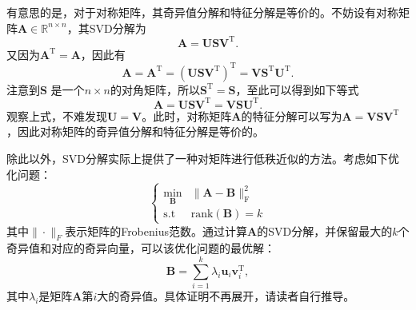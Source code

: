 有意思的是，对于对称矩阵，其奇异值分解和特征分解是等价的。不妨设有对称矩阵\( \mathbf{A} \in \mathbb{R}^{n \times n} \)，其SVD分解为
\[
    \mathbf{A} = \mathbf{U} \mathbf{S} \mathbf{V}^{\mathrm{T}}.
\]
又因为\( \mathbf{A}^{\mathrm{T}} = \mathbf{A} \)，因此有
\[
    \mathbf{A} = \mathbf{A}^{\mathrm{T}}= \left( \mathbf{U} \mathbf{S} \mathbf{V}^{\mathrm{T}} \right)^{\mathrm{T}} = \mathbf{V} \mathbf{S}^{\mathrm{T}} \mathbf{U}^{\mathrm{T}}.
\]
注意到\( \mathbf{S} \) 是一个\( n \times n \)的对角矩阵，所以\( \mathbf{S}^{\mathrm{T}}  = \mathbf{S} \)，至此可以得到如下等式
\[
    \mathbf{A} = \mathbf{U} \mathbf{S} \mathbf{V}^{\mathrm{T}} = \mathbf{V} \mathbf{S} \mathbf{U}^{\mathrm{T}}.
\]
观察上式，不难发现\( \mathbf{U} =  \mathbf{V} \)。此时，对称矩阵\( \mathbf{A} \)的特征分解可以写为\( \mathbf{A} = \mathbf{V} \mathbf{S} \mathbf{V}^{\mathrm{T}} \)，因此对称矩阵的奇异值分解和特征分解是等价的。

除此以外，SVD分解实际上提供了一种对矩阵进行低秩近似的方法。考虑如下优化问题：
\begin{equation}
    \begin{cases}
        \min_{\mathbf{B}} & \|\mathbf{A} - \mathbf{B}\|_{\mathrm{F}}^2 \\
        \text{s.t}        & \text{rank}(\mathbf{B}) = k
    \end{cases}
    \label{eq:sparse-approximation}
\end{equation}
其中\( \|\cdot\|_F \)表示矩阵的Frobenius范数。通过计算\( \mathbf{A} \)的SVD分解，并保留最大的\( k \)个奇异值和对应的奇异向量，可以该优化问题的最优解：
\begin{equation}
    \mathbf{B} = \sum_{i=1}^{k} \lambda_i \bm{u}_i \bm{v}_i^{\mathrm{T}},
    \label{eq:sparse-approximation-solution}
\end{equation}
其中\( \lambda_i \)是矩阵\( \mathbf{A} \)第\( i \)大的奇异值。具体证明不再展开，请读者自行推导。

